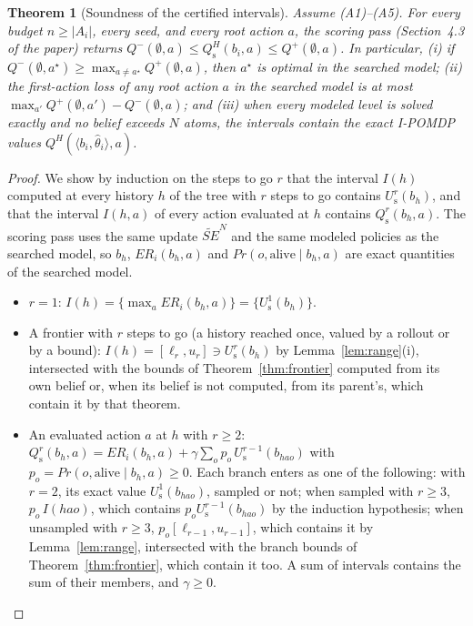 \documentclass{article}
\newcommand{\SE}{\mathit{SE}}
\newcommand{\ER}{\mathit{ER}}
\newcommand{\SEN}{\widetilde{\SE}^{N}}
\newcommand{\hth}{\hat{\theta}}
\renewcommand{\Pr}{\mathit{Pr}}
\newtheorem{theorem}{Theorem}
\begin{document}
\begin{theorem}[Soundness of the certified intervals]
\label{thm:sound}
Assume (A1)--(A5). For every budget $n \geq |A_i|$, every seed, and every root action $a$, the scoring pass (Section~4.3 of the paper) returns $Q^-(\emptyset, a) \leq Q^H_{\mathrm{s}}(b_i, a) \leq Q^+(\emptyset, a)$. In particular, (i) if $Q^-(\emptyset, a^\star) \geq \max_{a \neq a^\star} Q^+(\emptyset, a)$, then $a^\star$ is optimal in the searched model; (ii) the first-action loss of any root action $a$ in the searched model is at most $\max_{a'} Q^+(\emptyset, a') - Q^-(\emptyset, a)$; and (iii) when every modeled level is solved exactly and no belief exceeds $N$ atoms, the intervals contain the exact I-POMDP values $Q^H(\langle b_i, \hth_i \rangle, a)$.
\end{theorem}
\begin{proof}
We show by induction on the steps to go $r$ that the interval $I(h)$ computed at every history $h$ of the tree with $r$ steps to go contains $U^r_{\mathrm{s}}(b_h)$, and that the interval $I(h, a)$ of every action evaluated at $h$ contains $Q^r_{\mathrm{s}}(b_h, a)$. The scoring pass uses the same update $\SEN$ and the same modeled policies as the searched model, so $b_h$, $\ER_i(b_h, a)$ and $\Pr(o, \mathrm{alive} \mid b_h, a)$ are exact quantities of the searched model.
\begin{itemize}
\item $r = 1$: $I(h) = \{\max_a \ER_i(b_h, a)\} = \{U^1_{\mathrm{s}}(b_h)\}$.
\item A frontier with $r$ steps to go (a history reached once, valued by a rollout or by a bound): $I(h) = [\ell_r, u_r] \ni U^r_{\mathrm{s}}(b_h)$ by Lemma~\ref{lem:range}(i), intersected with the bounds of Theorem~\ref{thm:frontier} computed from its own belief or, when its belief is not computed, from its parent's, which contain it by that theorem.
\item An evaluated action $a$ at $h$ with $r \geq 2$: $Q^r_{\mathrm{s}}(b_h, a) = \ER_i(b_h, a) + \gamma \sum_o p_o\, U^{r-1}_{\mathrm{s}}(b_{hao})$ with $p_o = \Pr(o, \mathrm{alive} \mid b_h, a) \geq 0$. Each branch enters as one of the following: with $r = 2$, its exact value $U^1_{\mathrm{s}}(b_{hao})$, sampled or not; when sampled with $r \geq 3$, $p_o\, I(hao)$, which contains $p_o U^{r-1}_{\mathrm{s}}(b_{hao})$ by the induction hypothesis; when unsampled with $r \geq 3$, $p_o [\ell_{r-1}, u_{r-1}]$, which contains it by Lemma~\ref{lem:range}, intersected with the branch bounds of Theorem~\ref{thm:frontier}, which contain it too. A sum of intervals contains the sum of their members, and $\gamma \geq 0$.

\end{itemize}
\end{proof}
\end{document}
